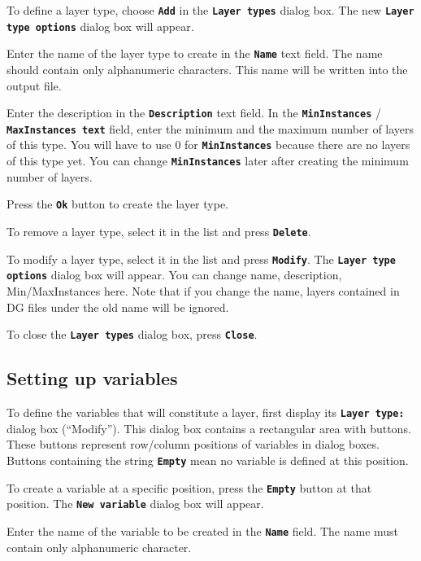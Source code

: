 \documentclass[12pt]{report}
\begin{document}
To define a layer type, choose \textbf{\texttt{Add}} in the
\textbf{\texttt{Layer types}} dialog box. The new \textbf{\texttt{Layer
type options}} dialog box will appear.

Enter the name of the layer type to create in the
\textbf{\texttt{Name}} text field. The name should contain only
alphanumeric characters. This name will be written into the output
file.

Enter the description in the \textbf{\texttt{Description}} text field.
In the \textbf{\texttt{MinInstances}} / \textbf{\texttt{MaxInstances
text}} field, enter the minimum and the maximum number of layers of
this type. You will have to use 0 for \textbf{\texttt{MinInstances}}
because there are no layers of this type yet. You can change
\textbf{\texttt{MinInstances}} later after creating the minimum number
of layers.

Press the \textbf{\texttt{Ok}} button to create the layer type.

To remove a layer type, select it in the list and press
\textbf{\texttt{Delete}}.

To modify a layer type, select it in the list and press
\textbf{\texttt{Modify}}. The \textbf{\texttt{Layer type options}}
dialog box will appear. You can change name, description,
Min/MaxInstances here. Note that if you change the name, layers
contained in DG files under the old name will be ignored.

To close the \textbf{\texttt{Layer types}} dialog box, press
\textbf{\texttt{Close}}.

\subsection{Setting up variables}

To define the variables that will constitute a layer, first display its
\textbf{\texttt{Layer type:}} dialog box (``Modify''). This dialog
box contains a rectangular area with buttons. These buttons represent
row/column positions of variables in dialog boxes. Buttons containing
the string \textbf{\texttt{Empty}} mean no variable is defined at this
position.

To create a variable at a specific position, press the
\textbf{\texttt{Empty}} button at that position. The
\textbf{\texttt{New variable}} dialog box will appear.

Enter the name of the variable to be created in the \textbf{\texttt{Name}}
field. The name must contain only alphanumeric character.
\end{document}

